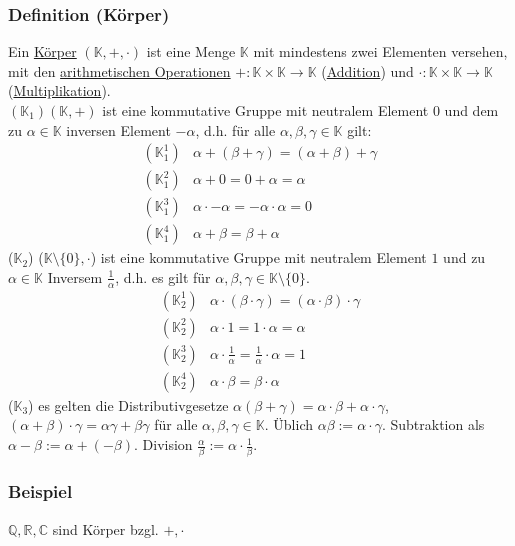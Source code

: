 \subsubsection{Definition (Körper)}
Ein \underline{Körper} $(\mathbb{K},+,\cdot )$ ist eine Menge $\mathbb{K}$ mit mindestens zwei Elementen versehen, mit den \underline{arithmetischen Operationen} $+: \mathbb{K}\times\mathbb{K}\rightarrow \mathbb{K}$ (\underline{Addition}) und $\cdot : \mathbb{K}\times\mathbb{K}\rightarrow \mathbb{K}$(\underline{Multiplikation}).\\
$(\mathbb{K}_1) (\mathbb{K},+)$ ist eine kommutative Gruppe mit neutralem Element $0$ und dem zu $\alpha\in\mathbb{K}$ inversen Element $-\alpha$, d.h. für alle $\alpha ,\beta ,\gamma\in\mathbb{K}$ gilt:\\
\begin{align*}
(\mathbb{K}_1^1) & \alpha +(\beta + \gamma )= (\alpha + \beta)+\gamma \\
(\mathbb{K}_1^2) & \alpha + 0 = 0 + \alpha = \alpha \\
(\mathbb{K}_1^3) & \alpha \cdot -\alpha = -\alpha \cdot \alpha = 0 \\
(\mathbb{K}_1^4) & \alpha + \beta = \beta + \alpha
\end{align*}
($\mathbb{K}_2$) ($\mathbb{K}\setminus \{0\},\cdot$) ist eine kommutative Gruppe mit neutralem Element $1$ und zu $\alpha\in \mathbb{K}$ Inversem $\frac{1}{\alpha}$, d.h. es gilt für $\alpha ,\beta ,\gamma \in \mathbb{K}\setminus \{0\}$.
\begin{align*}
(\mathbb{K}_2^1) & \alpha \cdot (\beta \cdot \gamma ) = (\alpha \cdot \beta )\cdot \gamma\\
(\mathbb{K}_2^2) & \alpha \cdot 1 = 1\cdot\alpha = \alpha \\
(\mathbb{K}_2^3) & \alpha \cdot \frac{1}{\alpha} = \frac{1}{\alpha}\cdot\alpha = 1 \\
(\mathbb{K}_2^4) & \alpha \cdot \beta = \beta \cdot \alpha
\end{align*}
($\mathbb{K}_3$) es gelten die Distributivgesetze $\alpha (\beta +\gamma )=\alpha \cdot \beta + \alpha \cdot \gamma$, $(\alpha + \beta ) \cdot \gamma = \alpha\gamma + \beta\gamma$ für alle $\alpha ,\beta ,\gamma \in \mathbb{K}$.  Üblich $\alpha\beta :=\alpha \cdot \gamma$.  Subtraktion als $\alpha - \beta := \alpha + (-\beta )$.  Division $\frac{\alpha}{\beta} := \alpha \cdot \frac{1}{\beta}$.
\subsubsection{Beispiel}
$\mathbb{Q},\mathbb{R},\mathbb{C}$ sind Körper bzgl. $+,\cdot$
